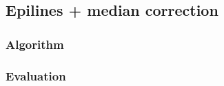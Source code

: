 \subsection{Epilines + median correction}
\label{sec:match:epi-median}

\subsubsection{Algorithm}

\subsubsection{Evaluation}
